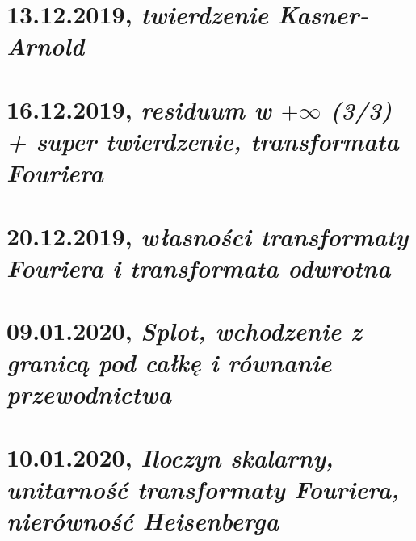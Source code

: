 \documentclass[b5paper]{memoir}
\begin{document}
\chapter{13.12.2019, \textit{twierdzenie Kasner-Arnold}}

\chapter{16.12.2019, \textit{residuum w $+\infty$ (3/3) + super twierdzenie, transformata Fouriera}}

\chapter{20.12.2019, \textit{własności transformaty Fouriera i transformata odwrotna}}

\chapter{09.01.2020, \textit{Splot, wchodzenie z granicą pod całkę i równanie przewodnictwa}}

\chapter{10.01.2020, \textit{Iloczyn skalarny, unitarność transformaty Fouriera, nierówność Heisenberga}}

\end{document}
